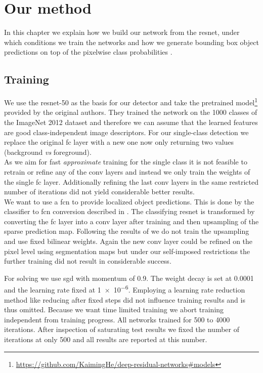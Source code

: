 %
\chapter{Our method}
\label{sec:pipeline}
In this chapter we explain how we build our network from the \gls{resnet}, under which conditions we train the networks  and how we generate bounding box object predictions on top of the pixelwise class probabilities .

\section{Training}
\label{sec:pipeline:training}
We use the \gls{resnet}-50  as the basis for our detector and take the pretrained model\footnote{\url{https://github.com/KaimingHe/deep-residual-networks\#models}} provided by the original authors. They trained the network on the 1000 classes of the ImageNet 2012 dataset \citep{russakovsky_imagenet_2015} and therefore we can assume that the learned features are good class-independent image descriptors. For our single-class detection we replace the original \gls{fc} layer with a new one now only returning two values (background \textit{vs} foreground).\\
As we aim for fast \textit{approximate} training for the single class it is not feasible to retrain or refine any of the \gls{conv} layers and instead we only train the weights of the single \gls{fc} layer. Additionally refining the last \gls{conv} layers in the same restricted number of iterations did not yield considerable better results.\\
We want to use a \gls{fcn} to provide localized object predictions. This is done by the classifier to \gls{fcn} conversion described in . The classifying \gls{resnet} is transformed by converting the \gls{fc} layer into a \gls{conv} layer after training and then upsampling of the sparse prediction map. Following the results of \citep{shelhamer_fully_2016} we do not train the upsampling and use fixed bilinear weights. Again the new \gls{conv} layer could be refined on the pixel level using segmentation maps but under our self-imposed restrictions the further training did not result in considerable success.

For solving we use \gls{sgd} with momentum of 0.9. The weight decay is set at 0.0001 and the learning rate fixed at \num{1e-6}. Employing a learning rate reduction method like reducing after fixed steps did not influence training results and is thus omitted. Because we want time limited training we abort training independent from training progress. All networks trained for 500 to 4000 iterations. After inspection of saturating test results we fixed the number of iterations at only 500 and all results are reported at this number.

